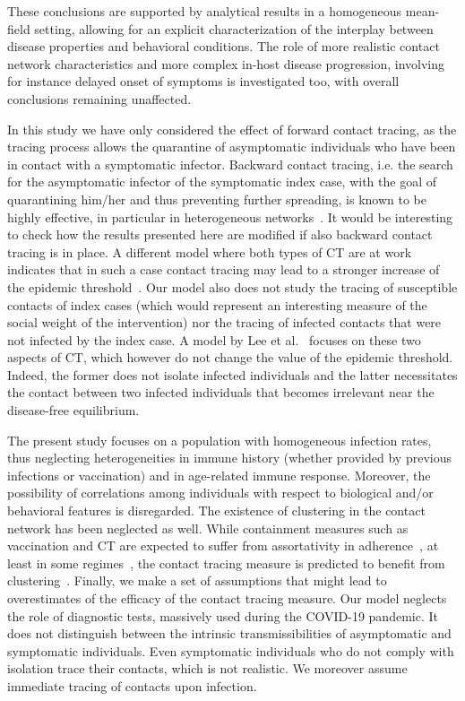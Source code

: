 \documentclass[aps,twocolumn,superscriptaddress,nofootinbib,pre,floatfix]{revtex4-1}
\begin{document}
These conclusions are supported by analytical results in a homogeneous
mean-field setting, allowing for an explicit characterization of the
interplay between disease properties and behavioral
conditions. The role of more realistic contact network characteristics
and more complex in-host disease progression, involving for instance
delayed onset of symptoms is investigated too, with overall
conclusions remaining unaffected.

In this study we have only considered the effect of forward contact
tracing, as the tracing process allows the quarantine of asymptomatic
individuals who have been in contact with a symptomatic infector.
Backward contact tracing, i.e. the search for the asymptomatic
infector of the symptomatic index case, with the goal of quarantining
him/her and thus preventing further spreading, is known to be highly
effective, in particular in heterogeneous networks~\cite{kojaku21}. It
would be interesting to check how the results presented here are
modified if also backward contact tracing is in place.  A different
model where both types of CT are at work indicates that in such a case
contact tracing may lead to a stronger increase of the epidemic
threshold~\cite{Mancastroppa21}.  Our model also does not study the
tracing of susceptible contacts of index cases (which would represent
an interesting measure of the social weight of the intervention) nor
the tracing of infected contacts that were not infected by the index
case.  A model by Lee et al.~\cite{Lee} focuses on these two aspects
of CT, which however do not change the value of the epidemic threshold.
Indeed, the former does not isolate infected individuals and the latter
necessitates the contact between two infected individuals that becomes
irrelevant near the disease-free equilibrium.

The present study focuses on a population with homogeneous infection rates,
thus neglecting heterogeneities in immune history (whether provided by
previous infections or vaccination) and in age-related immune
response.  Moreover, the possibility of correlations among individuals
with respect to biological and/or behavioral features is disregarded.
The existence of clustering in the contact network has been neglected
as well.  While containment measures such as vaccination and CT are
expected to suffer from assortativity in adherence~\cite{Glaubitz,
  Rizi}, at least in some regimes~\cite{Burgio}, the contact tracing
measure is predicted to benefit from clustering~\cite{House,
  Burdinski, Kiss}.  Finally, we make a set of assumptions that might lead
to overestimates of the efficacy of the contact tracing measure. Our
model neglects the role of diagnostic tests, massively used during the
COVID-19 pandemic. It does not distinguish between the intrinsic
transmissibilities of asymptomatic and symptomatic individuals. Even
symptomatic individuals who do not comply with isolation trace their
contacts, which is not realistic. We moreover assume immediate tracing
of contacts upon infection.
\end{document}
